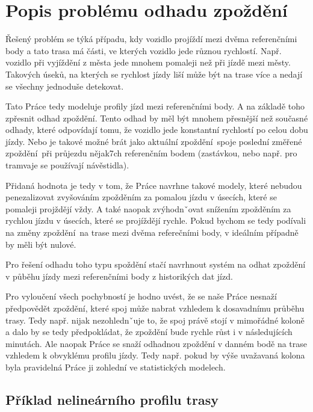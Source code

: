 \section{Popis problému odhadu zpoždění}

Řešený problém se týká případu, kdy vozidlo projíždí mezi dvěma referenčními body a tato trasa má části, ve kterých vozidlo jede různou rychlostí. Např. vozidlo při vyjíždění z města jede mnohem pomaleji než při jízdě mezi městy. Takových úseků, na kterých se rychlost jízdy liší může být na trase více a nedají se všechny jednoduše detekovat.

\bigbreak

Tato Práce tedy modeluje profily jízd mezi referenčními body. A na základě toho zpřesnit odhad zpoždění. Tento odhad by měl být mnohem přesnější než současné odhady, které odpovídají tomu, že vozidlo jede konstantní rychlostí po celou dobu jízdy. Nebo je takové možné brát jako aktuální zpoždění spoje poslední změřené zpoždění při průjezdu nějak7ch referenčním bodem (zastávkou, nebo např. pro tramvaje se používají návěstidla).

\bigbreak

Přidaná hodnota je tedy v tom, že Práce navrhne takové modely, které nebudou penezalizovat zvyšováním zpožděním za pomalou jízdu v úsecích, které se pomaleji projždějí vždy. A také naopak zvýhodnˇovat snížením zpožděním za rychlou jízdu v úsecích, které se projíždějí rychle. Pokud bychom se tedy podívali na změny zpoždění na trase mezi dvěma referečními body, v ideálním případně by měli být nulové.

\bigbreak

Pro řešení odhadu toho typu spoždění stačí navrhnout systém na odhat zpoždění v půběhu jízdy mezi referenčními body z historikých dat jízd.

\bigbreak

Pro vyloučení všech pochybností je hodno uvést, že se naše Práce nesnaží předpovědět zpoždění, které spoj může nabrat vzhledem k dosavadnímu průběhu trasy. Tedy např. nijak nezohlednˇuje to, že spoj právě stojí v mimořádné koloně a dalo by se tedy předpokládat, že zpoždění bude rychle růst i v následujících minutách. Ale naopak Práce se snaží odhadnou zpoždění v danném bodě na trase vzhledem k obvyklému profilu jízdy. Tedy např. pokud by výše uvažavaná kolona byla pravidelná Práce ji zohlední ve statistických modelech.


\subsection{Příklad nelineárního profilu trasy}

